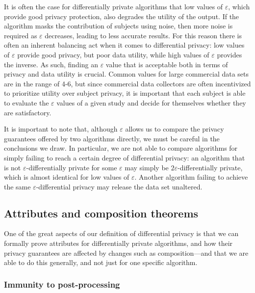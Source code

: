 \documentclass[12pt]{article}
\renewcommand{\epsilon}{\varepsilon}
\begin{document}
It is often the case for differentially private algorithms that low values of $\epsilon$, which provide good privacy protection, also degrades the utility of the output. If the algorithm masks the contribution of subjects using noise, then more noise is required as $\epsilon$ decreases, leading to less accurate results. For this reason there is often an inherent balancing act when it comes to differential privacy: low values of $\epsilon$ provide good privacy, but poor data utility, while high values of $\epsilon$ provides the inverse. As such, finding an $\epsilon$ value that is acceptable both in terms of privacy and data utility is crucial. Common values for large commercial data sets \cite{apple_differential,us_census} are in the range of 4-6, but since commercial data collectors are often incentivized to prioritize utility over subject privacy, it is important that each subject is able to evaluate the $\epsilon$ values of a given study and decide for themselves whether they are satisfactory. \bigskip

It is important to note that, although $\epsilon$ allows us to compare the privacy guarantees offered by two algorithms directly, we must be careful in the conclusions we draw. In particular, we are not able to compare algorithms for simply failing to reach a certain degree of differential privacy: an algorithm that is not $\epsilon$-differentially private for some $\epsilon$ may simply be $2\epsilon$-differentially private, which is almost identical for low values of $\epsilon$. Another algorithm failing to achieve the same $\epsilon$-differential privacy may release the data set unaltered.



\subsection{Attributes and composition theorems \label{sec:composition}}

One of the great aspects of our definition of differential privacy is that we can formally prove attributes for differentially private algorithms, and how their privacy guarantees are affected by changes such as composition---and that we are able to do this generally, and not just for one specific algorithm.

\subsubsection{Immunity to post-processing}
\end{document}
